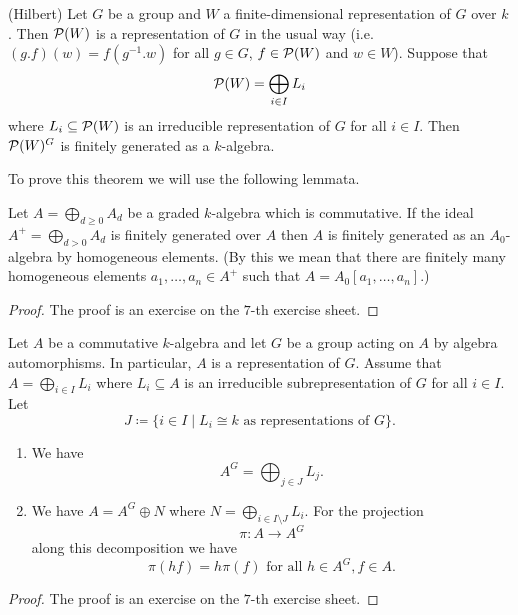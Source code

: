 \begin{thrm}(Hilbert)
 Let $G$ be a group and $W$ a finite-dimensional representation of $G$ over $k$. Then $\mathcal{P}(W)$ is a representation of $G$ in the usual way (i.e.\ $(g.f)(w) = f\left(g^{-1}.w\right)$ for all $g \in G$, $f \in \mathcal{P}(W)$ and $w \in W$). Suppose that
 \[
  \mathcal{P}(W) = \bigoplus_{i \in I} L_i
 \]
 where $L_i \subseteq \mathcal{P}(W)$ is an irreducible representation of $G$ for all $i \in I$. Then $\mathcal{P}(W)^G$ is finitely generated as a $k$-algebra.
\end{thrm}


To prove this theorem we will use the following lemmata.


\begin{lem}\label{lem: technical lemma about generating}
 Let $A = \bigoplus_{d \geq 0} A_d$ be a graded $k$-algebra which is commutative. If the ideal $A^+ = \bigoplus_{d > 0} A_d$ is finitely generated over $A$ then $A$ is finitely generated as an $A_0$-algebra by homogeneous elements. (By this we mean that there are finitely many homogeneous elements $a_1, \dotsc, a_n \in A^+$ such that $A = A_0[a_1, \dotsc, a_n]$.)
\end{lem}
\begin{proof}
 The proof is an exercise on the $7$-th exercise sheet.
\end{proof}


\begin{lem}\label{lem: projection reynold operator}
 Let $A$ be a commutative $k$-algebra and let $G$ be a group acting on $A$ by algebra automorphisms. In particular, $A$ is a representation of $G$. Assume that $A = \bigoplus_{i \in I} L_i$ where $L_i \subseteq A$ is an irreducible subrepresentation of $G$ for all $i \in I$. Let
 \[
  J \coloneqq \{i \in I \mid L_i \cong k \text{ as representations of $G$}\}.
 \]
 \begin{enumerate}[label=\emph{\alph*)},leftmargin=*]
  \item
   We have
   \[
    A^G = \bigoplus_{j \in J} L_j.
   \]
  \item
   We have $A = A^G \oplus N$ where $N = \bigoplus_{i \in I \setminus J} L_i$. For the projection
   \[
    \pi \colon A \to A^G
   \]
   along this decomposition we have
   \[
    \pi(hf) = h\pi(f) \text{ for all } h \in A^G, f \in A.
   \]
 \end{enumerate}
\end{lem}
\begin{proof}
 The proof is an exercise on the $7$-th exercise sheet.
\end{proof}


